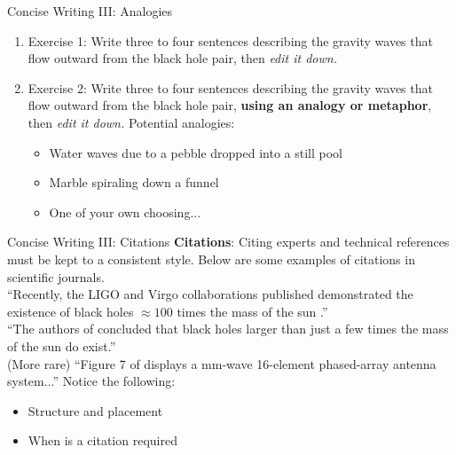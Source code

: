 \documentclass{beamer}
\begin{document}
\begin{frame}{Concise Writing III: Analogies}
\begin{enumerate}
\item Exercise 1: Write three to four sentences describing the gravity waves that flow outward from the black hole pair, then \textit{edit it down.}
\item Exercise 2: Write three to four sentences describing the gravity waves that flow outward from the black hole pair, \textbf{using an analogy or metaphor}, then \textit{edit it down.} Potential analogies:
\begin{itemize}
\item Water waves due to a pebble dropped into a still pool
\item Marble spiraling down a funnel
\item One of your own choosing...
\end{itemize}
\end{enumerate}
\end{frame}

\begin{frame}{Concise Writing III: Citations}
\alert{\textbf{Citations}:} Citing experts and technical references must be kept to a consistent style.  Below are some examples of citations in scientific journals. \\ \vspace{0.25cm}
``Recently, the LIGO and Virgo collaborations published demonstrated the existence of black holes $\approx 100$ times the mass of the sun \cite{10.1103/PhysRevLett.125.101102}.'' \\ \vspace{0.25cm}
``The authors of \cite{10.1103/PhysRevLett.118.221101} concluded that black holes larger than just a few times the mass of the sun do exist.'' \\ \vspace{0.25cm}
(More rare) ``Figure 7 of \cite{10.1109/iwem.2014.6963645} displays a mm-wave 16-element phased-array antenna system...''
Notice the following:
\begin{itemize}
\item Structure and placement
\item When is a citation required
\end{itemize}
\end{frame}
\end{document}
